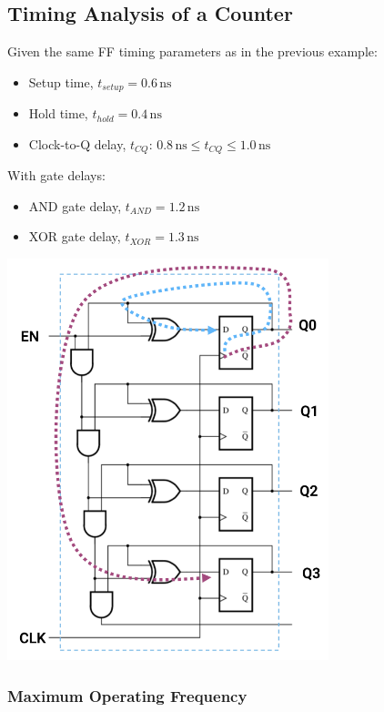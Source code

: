\documentclass[12pt,openany]{book}
\begin{document}
\subsection{Timing Analysis of a Counter}
\begin{minipage}{0.4\textwidth}
	Given the same FF timing parameters as in the previous example:
	\begin{itemize}
	    \item[] Setup time, $t_{setup} = 0.6 \, \text{ns}$
	    \item[] Hold time, $t_{hold} = 0.4 \, \text{ns}$
	    \item[] Clock-to-Q delay, \newline $t_{CQ}$: $0.8 \, \text{ns} \le t_{CQ} \le 1.0 \, \text{ns}$
	\end{itemize}
	With gate delays:
	\begin{itemize}
	    \item[] AND gate delay, $t_{AND} = 1.2 \, \text{ns}$
	    \item[] XOR gate delay, $t_{XOR} = 1.3 \, \text{ns}$
	\end{itemize}
\end{minipage}
\hfill
\begin{minipage}{0.5\textwidth}
	\centering
	\includegraphics[width=0.7\textwidth]{circuits/15.1.2_5.png}
\end{minipage}

\subsubsection{Maximum Operating Frequency}
\end{document}
